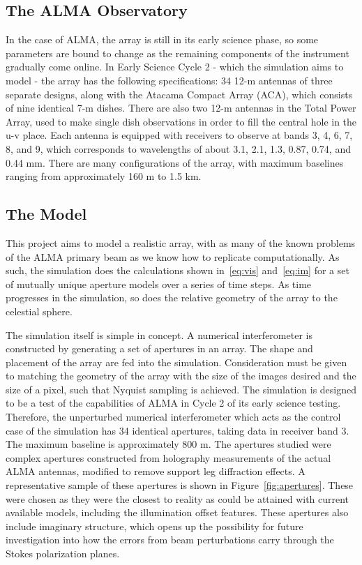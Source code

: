 \documentclass[11pt]{article}
\begin{document}
\subsection{The ALMA Observatory}

In the case of ALMA, the array is still in its early science phase, so some 
parameters are bound to change as the remaining components of the instrument 
gradually come online. In Early Science Cycle 2 - which the simulation aims to 
model - the array has the following specifications: 34 12-m antennas of three 
separate designs, along with the Atacama Compact Array (ACA), which consists of 
nine identical 7-m dishes. There are also two 12-m antennas in the Total Power 
Array, used to make single dish observations in order to fill the central hole 
in the u-v place. Each antenna is equipped with receivers to observe at bands 
3, 4, 6, 7, 8, and 9, which corresponds to wavelengths of about 3.1, 2.1, 1.3, 
0.87, 0.74, and 0.44 mm. There are many configurations of the array, with 
  maximum baselines ranging from approximately 160 m to 1.5 km.

\subsection{The Model}

This project aims to model a realistic array, with as many of the known 
problems of the ALMA primary beam as we know how to replicate computationally.  
As such, the simulation does the calculations shown in~\eqref{eq:vis} 
and~\eqref{eq:im} for a set of mutually unique aperture models over a series of 
time steps. As time progresses in the simulation, so does the relative geometry 
of the array to the celestial sphere.

The simulation itself is simple in concept. A numerical interferometer is 
constructed by generating a set of apertures in an array. The shape and 
placement of the array are fed into the simulation. Consideration must be given 
to matching the geometry of the array with the size of the images desired and 
the size of a pixel, such that Nyquist sampling is achieved. The simulation is 
designed to be a test of the capabilities of ALMA in Cycle 2 of its early 
science testing. Therefore, the unperturbed numerical interferometer which acts 
as the control case of the simulation has 34 identical apertures, taking data 
in receiver band 3. The maximum baseline is approximately 800 m.
The apertures studied were complex apertures constructed from holography 
measurements of the actual ALMA antennas, modified to remove support leg 
diffraction effects. A representative sample of these apertures is shown in
Figure~\ref{fig:apertures}. These were chosen as they were the closest to 
reality as could be attained with current available models, including the 
illumination offset features. These apertures also include imaginary structure, 
which opens up the possibility for future investigation into how the
errors from beam perturbations carry through the Stokes polarization planes.
\end{document}
